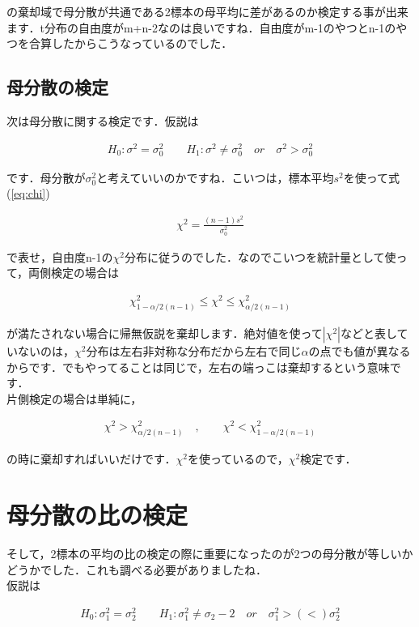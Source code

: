 \documentclass[11pt,a4paper,uplatex]{ujreport} 	%
\begin{document}
の棄却域で母分散が共通である2標本の母平均に差があるのか検定する事が出来ます．t分布の自由度がm+n-2なのは良いですね．自由度がm-1のやつとn-1のやつを合算したからこうなっているのでした．

\subsection{母分散の検定}
次は母分散に関する検定です．仮説は

\begin{align}
  H_0 : \sigma^2 =\sigma_0^2 \qquad H_1: \sigma^2 \neq \sigma_0^2 \quad or \quad \sigma^2 > \sigma_0^2
\end{align}

です．母分散が$\sigma_0^2$と考えていいのかですね．こいつは，標本平均$s^2$を使って式(\ref{eq:chi})

\begin{align}
  \chi^2 = \frac{(n-1)s^2}{\sigma_0^2}
\end{align}

で表せ，自由度n-1の$\chi^2$分布に従うのでした．なのでこいつを統計量として使って，両側検定の場合は

\begin{align}
  \chi^2_{1-\alpha/2(n-1)} \leq \chi^2 \leq \chi^2_{\alpha/2(n-1)}
\end{align}

が満たされない場合に帰無仮説を棄却します．絶対値を使って$|\chi^2|$などと表していないのは，$\chi^2$分布は左右非対称な分布だから左右で同じ$\alpha$の点でも値が異なるからです．でもやってることは同じで，左右の端っこは棄却するという意味です．\\

片側検定の場合は単純に，

\begin{align}
  \chi^2 > \chi^2_{\alpha/2(n-1)}\quad,　\qquad \chi^2 < \chi^2_{1-\alpha/2(n-1)} 
\end{align}

の時に棄却すればいいだけです．$\chi^2$を使っているので，$\chi^2$検定です．


\section{母分散の比の検定}
そして，2標本の平均の比の検定の際に重要になったのが2つの母分散が等しいかどうかでした．これも調べる必要がありましたね．\\

仮説は

\begin{align}
  H_0 : \sigma_1^2 = \sigma_2^2 \qquad H_1 : \sigma_1^2 \neq \sigma_2-2 \quad or \quad \sigma_1^2 >(<) \sigma_2^2
\end{align}
\end{document}
